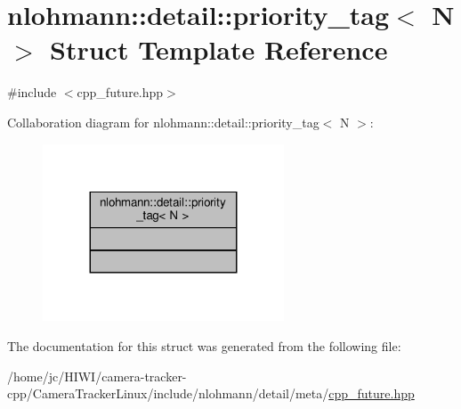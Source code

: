 \hypertarget{structnlohmann_1_1detail_1_1priority__tag}{}\section{nlohmann\+:\+:detail\+:\+:priority\+\_\+tag$<$ N $>$ Struct Template Reference}
\label{structnlohmann_1_1detail_1_1priority__tag}


{\ttfamily \#include $<$cpp\+\_\+future.\+hpp$>$}



Collaboration diagram for nlohmann\+:\+:detail\+:\+:priority\+\_\+tag$<$ N $>$\+:\nopagebreak
\begin{figure}[H]
\begin{center}
\leavevmode
\includegraphics[width=203pt]{structnlohmann_1_1detail_1_1priority__tag__coll__graph}
\end{center}
\end{figure}


The documentation for this struct was generated from the following file\+:\begin{DoxyCompactItemize}
\item 
/home/jc/\+H\+I\+W\+I/camera-\/tracker-\/cpp/\+Camera\+Tracker\+Linux/include/nlohmann/detail/meta/\hyperlink{cpp__future_8hpp}{cpp\+\_\+future.\+hpp}\end{DoxyCompactItemize}
